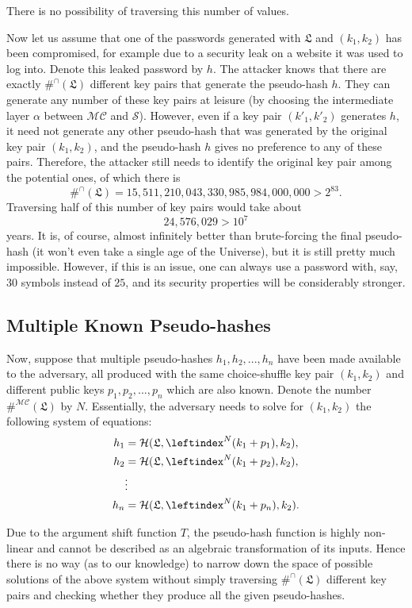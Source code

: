 \documentclass[a4paper, 10pt]{article}
\theoremstyle{plain}
\theoremstyle{definition}
\newcommand{\li}{\leftindex}
\newcommand{\conf}{\mathfrak{L}}
\newcommand{\mc}{\mathcal{MC}}
\newcommand{\h}{\mathcal{H}}
\newcommand{\s}{\mathcal{S}}
\begin{document}
There is no possibility of traversing this number of values.

Now let us assume that one of the passwords generated with $\conf$ and $(k_1, k_2)$ has been compromised, for example due to a security leak on a website it was used to log into. Denote this leaked password by $h$. The attacker knows that there are exactly $\#^\cap (\conf)$ different key pairs that generate the pseudo-hash $h$. They can generate any number of these key pairs at leisure (by choosing the intermediate layer $\alpha$ between $\mc$ and $\s$). However, even if a key pair $(k'_1, k'_2)$ generates $h$, it need not generate any other pseudo-hash that was generated by the original key pair $(k_1,k_2)$, and the pseudo-hash $h$ gives no preference to any of these pairs. Therefore, the attacker still needs to identify the original key pair among the potential ones, of which there is
\[
  \#^\cap (\conf) = 15,511,210,043,330,985,984,000,000 > 2^{83}.
\]
Traversing half of this number of key pairs would take about
\[
  24,576,029 > 10^7
\]
years. It is, of course, almost infinitely better than brute-forcing the final pseudo-hash (it won't even take a single age of the Universe), but it is still pretty much impossible. However, if this is an issue, one can always use a password with, say, $30$ symbols instead of $25$, and its security properties will be considerably stronger.

\subsection{Multiple Known Pseudo-hashes}

Now, suppose that multiple pseudo-hashes $h_1, h_2, ..., h_n$ have been made available to the adversary, all produced with the same choice-shuffle key pair $(k_1, k_2)$ and different public keys $p_1, p_2, ..., p_n$ which are also known. Denote the number $\#^\mc (\conf)$ by $N$. Essentially, the adversary needs to solve for $(k_1, k_2)$ the following system of equations:
\begin{align*}
  h_1 &= \h(\conf, \li^N (k_1 + p_1), k_2),\\
  h_2 &= \h(\conf, \li^N (k_1 + p_2), k_2),\\
  &\vdots\\
  h_n &= \h(\conf, \li^N (k_1 + p_n), k_2).
\end{align*}

Due to the argument shift function $T$, the pseudo-hash function is highly non-linear and cannot be described as an algebraic transformation of its inputs. Hence there is no way (as to our knowledge) to narrow down the space of possible solutions of the above system without simply traversing $\#^\cap (\conf)$ different key pairs and checking whether they produce all the given pseudo-hashes.
\end{document}
